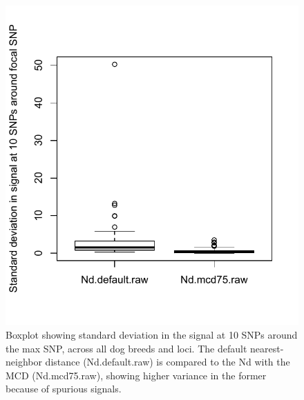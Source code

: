 \documentclass[12pt, oneside]{amsart}
\begin{document}
\newpage
\begin{figure}[h]
\begin{center}
\includegraphics[width=6in]{../figures_man2/S10-Dog-CompareVarNd.pdf}
\end{center}
\caption[]{Boxplot showing standard deviation in the signal at 10 SNPs around the max SNP, across all dog breeds and loci. The default nearest-neighbor distance (Nd.default.raw) is compared to the Nd with the MCD (Nd.mcd75.raw), showing higher variance in the former because of spurious signals.}
 \label{fig:???}
\end{figure}
\end{document}
